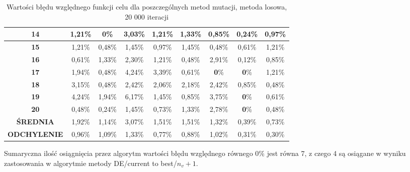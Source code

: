 \begin{itemize}
\begin{table}[h!]
\begin{center}
{\begin{tabular}{|c|c|c|c|c|c|c|c|c|}
\textbf{14}&1,21\%&\color{green}\textbf{0}\%&3,03\%&1,21\%&1,33\%&0,85\%&0,24\%&0,97\% \\ \hline
\textbf{15}&1,21\%&0,48\%&1,45\%&0,97\%&1,45\%&0,48\%&0,61\%&1,21\% \\ \hline
\textbf{16}&0,61\%&1,33\%&2,30\%&1,21\%&0,48\%&2,91\%&0,12\%&0,85\% \\ \hline
\textbf{17}&1,94\%&0,48\%&4,24\%&3,39\%&0,61\%&\color{green}\textbf{0}\%&\color{green}\textbf{0}\%&1,21\% \\ \hline
\textbf{18}&3,15\%&0,48\%&2,42\%&2,06\%&2,18\%&2,42\%&0,85\%&0,48\% \\ \hline
\textbf{19}&4,24\%&1,94\%&6,17\%&1,45\%&0,85\%&3,75\%&\color{green}\textbf{0}\%&0,61\% \\ \hline
\textbf{20}&0,48\%&0,24\%&1,45\%&0,73\%&1,33\%&2,78\%&\color{green}\textbf{0}\%&0,48\% \\ \hline
\textbf{ŚREDNIA}&1,92\%&1,14\%&3,07\%&1,51\%&1,51\%&1,32\%&0,39\%&0,73\% \\ \hline
\textbf{ODCHYLENIE}&0,96\%&1,09\%&1,33\%&0,77\%&0,88\%&1,02\%&0,31\%&0,30\% \\ \hline
\end{tabular}}
\caption{Wartości błędu względnego funkcji celu dla poszczególnych metod mutacji, metoda losowa, 20 000 iteracji}
\label{losowa20}
\end{center}
\end{table}

Sumaryczna ilość osiągnięcia przez algorytm wartości błędu względnego równego 0\% jest równa 7, z czego 4 są osiągane w wyniku zastosowania w algorytmie metody DE/current to best/$n_{v}+1$.

\begin{table}[h!]
\begin{center}
\caption{Ranking metod mutacji na podstawie średniej wartości błędu względnego funkcji celu, metoda losowa, 20 000 iteracji}
\label{ranking5}
\end{center}
\end{table}


\end{itemize}

